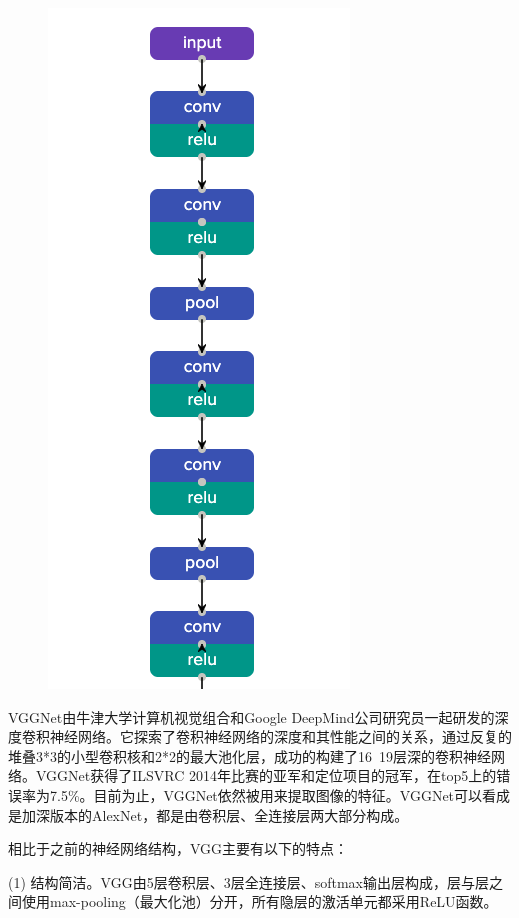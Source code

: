 \documentclass{progbookcn}
\begin{document}
\begin{figure}

\vspace{-0.9cm}
\includegraphics[scale = 0.5]{vgg.png}

\end{figure}
VGGNet由牛津大学计算机视觉组合和Google DeepMind公司研究员一起研发的深度卷积神经网络。它探索了卷积神经网络的深度和其性能之间的关系，通过反复的堆叠3*3的小型卷积核和2*2的最大池化层，成功的构建了16~19层深的卷积神经网络。VGGNet获得了ILSVRC 2014年比赛的亚军和定位项目的冠军，在top5上的错误率为7.5\%。目前为止，VGGNet依然被用来提取图像的特征。VGGNet可以看成是加深版本的AlexNet，都是由卷积层、全连接层两大部分构成。

相比于之前的神经网络结构，VGG主要有以下的特点：



(1) 结构简洁。VGG由5层卷积层、3层全连接层、softmax输出层构成，层与层之间使用max-pooling（最大化池）分开，所有隐层的激活单元都采用ReLU函数。
\end{document}
